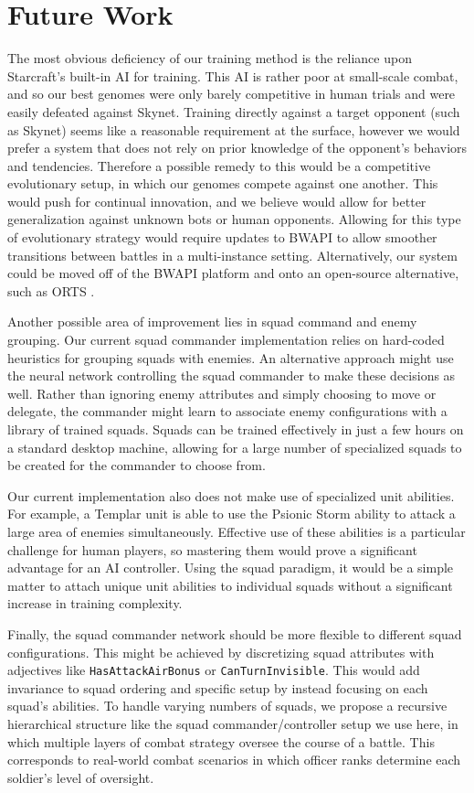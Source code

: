 \documentclass[a4paper]{article}
\begin{document}
\section{Future Work}
\label{sec:future}

The most obvious deficiency of our training method is the reliance upon Starcraft's built-in AI for training. This AI is rather poor at small-scale combat, and so our best genomes were only barely competitive in human trials and were easily defeated against Skynet. Training directly against a target opponent (such as Skynet) seems like a reasonable requirement at the surface, however we would prefer a system that does not rely on prior knowledge of the opponent's behaviors and tendencies. Therefore a possible remedy to this would be a competitive evolutionary setup, in which our genomes compete against one another. This would push for continual innovation, and we believe would allow for better generalization against unknown bots or human opponents. Allowing for this type of evolutionary strategy would require updates to BWAPI to allow smoother transitions between battles in a multi-instance setting. Alternatively, our system could be moved off of the BWAPI platform and onto an open-source alternative, such as ORTS \cite{orts}.

Another possible area of improvement lies in squad command and enemy grouping. Our current squad commander implementation relies on hard-coded heuristics for grouping squads with enemies. An alternative approach might use the neural network controlling the squad commander to make these decisions as well. Rather than ignoring enemy attributes and simply choosing to move or delegate, the commander might learn to associate enemy configurations with a library of trained squads. Squads can be trained effectively in just a few hours on a standard desktop machine, allowing for a large number of specialized squads to be created for the commander to choose from.

Our current implementation also does not make use of specialized unit abilities. For example, a Templar unit is able to use the Psionic Storm ability to attack a large area of enemies simultaneously. Effective use of these abilities is a particular challenge for human players, so mastering them would prove a significant advantage for an AI controller. Using the squad paradigm, it would be a simple matter to attach unique unit abilities to individual squads without a significant increase in training complexity.

Finally, the squad commander network should be more flexible to different squad configurations. This might be achieved by discretizing squad attributes with adjectives like \texttt{HasAttackAirBonus} or \texttt{CanTurnInvisible}. This would add invariance to squad ordering and specific setup by instead focusing on each squad's abilities. To handle varying numbers of squads, we propose a recursive hierarchical structure like the squad commander/controller setup we use here, in which multiple layers of combat strategy oversee the course of a battle. This corresponds to real-world combat scenarios in which officer ranks determine each soldier's level of oversight.
\end{document}
